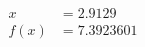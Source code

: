 \documentclass[preview]{standalone}
\begin{document}
\begin{align*}
x &= 2.9129\\f(x) &= 7.3923601
\end{align*}
\end{document}
